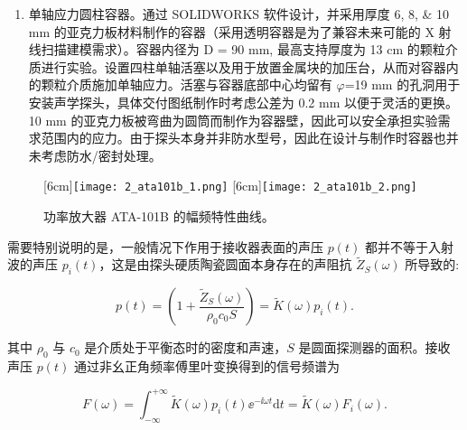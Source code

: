 \begin{enumerate}
  \item 单轴应力圆柱容器。通过 SOLIDWORKS 软件设计，并采用厚度 \numlist{6;8;10} \unit{\milli\meter} 的亚克力板材料制作的容器（采用透明容器是为了兼容未来可能的 X 射线扫描建模需求）。容器内径为 D = 90 \unit{\milli\meter}, 最高支持厚度为 13 \unit{\centi\meter} 的颗粒介质进行实验。设置四柱单轴活塞以及用于放置金属块的加压台，从而对容器内的颗粒介质施加单轴应力。活塞与容器底部中心均留有 $\varphi$=19 \unit{\milli\meter} 的孔洞用于安装声学探头，具体交付图纸制作时考虑公差为 0.2 \unit{\milli\meter} 以便于灵活的更换。10 \unit{\milli\meter} 的亚克力板被弯曲为圆筒而制作为容器壁，因此可以安全承担实验需求范围内的应力。由于探头本身并非防水型号，因此在设计与制作时容器也并未考虑防水/密封处理。
\end{enumerate}

\begin{figure}[!hbtp]
  \centering
                  [6cm]{\texttt{[image: 2\_ata101b\_1.png]}}
  \hspace{1cm}
                  [6cm]{\texttt{[image: 2\_ata101b\_2.png]}}
  \caption{功率放大器 ATA-101B 的幅频特性曲线。}
  \label{fig:amp_freq_curve}
\end{figure}


需要特别说明的是，一般情况下作用于接收器表面的声压 $p(t)$ 都并不等于入射波的声压 $p_{i}(t)$，这是由探头硬质陶瓷圆面本身存在的声阻抗 $\widetilde{Z}_{S}(\omega)$ 所导致的:

\begin{equation}
  p(t) = \left(1 + \frac{\widetilde{Z}_{S}(\omega)}{\rho_{0}c_{0}S}\right) =\widetilde{K}(\omega)p_{i}(t).
\end{equation}

其中 $\rho_{0}$ 与 $c_{0}$ 是介质处于平衡态时的密度和声速，$S$ 是圆面探测器的面积。接收声压 $p(t)$ 通过非幺正角频率傅里叶变换得到的信号频谱为

\begin{equation}
  F(\omega) = \int_{-\infty}^{+\infty}\widetilde{K}(\omega)p_{i}(t){\ee}^{-\ii\omega t}\mathrm{d}t = \widetilde{K}(\omega)F_{i}(\omega).
\end{equation}

